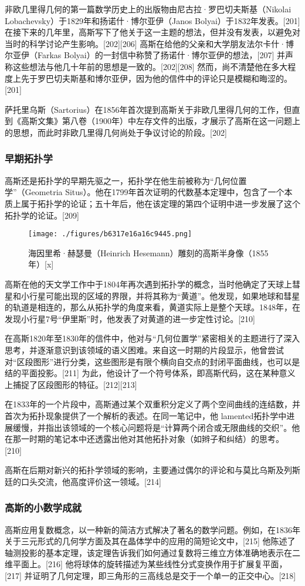 非欧几里得几何的第一篇数学历史上的出版物由尼古拉·罗巴切夫斯基（Nikolai Lobachevsky）于1829年和扬诺什·博尔亚伊（Janos Bolyai）于1832年发表。[201] 在接下来的几年里，高斯写下了他关于这一主题的想法，但并没有发表，以避免对当时的科学讨论产生影响。[202][206] 高斯在给他的父亲和大学朋友法尔卡什·博尔亚伊（Farkas Bolyai）的一封信中称赞了扬诺什·博尔亚伊的想法，[207] 并声称这些想法与他几十年前的思想是一致的。[202][208] 然而，尚不清楚他在多大程度上先于罗巴切夫斯基和博尔亚伊，因为他的信件中的评论只是模糊和晦涩的。[201]

萨托里乌斯（Sartorius）在1856年首次提到高斯关于非欧几里得几何的工作，但直到《高斯文集》第八卷（1900年）中左存文件的出版，才展示了高斯在这一问题上的思想，而此时非欧几里得几何尚处于争议讨论的阶段。[202]
\subsubsection{早期拓扑学}  
高斯还是拓扑学的早期先驱之一，拓扑学在他生前被称为“几何位置学”（Geometria Situs）。他在1799年首次证明的代数基本定理中，包含了一个本质上属于拓扑学的论证；五十年后，他在该定理的第四个证明中进一步发展了这个拓扑学的论证。[209]
\begin{figure}[ht]
\centering
\texttt{[image: ./figures/b6317e16a16c9445.png]}
\caption{海因里希·赫瑟曼（Heinrich Hesemann）雕刻的高斯半身像（1855年）[x]} \label{fig_KRGS_20}
\end{figure}
高斯在他的天文学工作中于1804年再次遇到拓扑学的概念，当时他确定了天球上彗星和小行星可能出现的区域的界限，并将其称为“黄道”。他发现，如果地球和彗星的轨道是相连的，那么从拓扑学的角度来看，黄道实际上是整个天球。1848年，在发现小行星7号“伊里斯”时，他发表了对黄道的进一步定性讨论。[210]

在高斯1820年至1830年的信件中，他对与“几何位置学”紧密相关的主题进行了深入思考，并逐渐意识到该领域的语义困难。来自这一时期的片段显示，他曾尝试对“区段图形”进行分类，这些图形是有限个横向自交点的封闭平面曲线，也可以是结的平面投影。[211] 为此，他设计了一个符号体系，即高斯代码，这在某种意义上捕捉了区段图形的特征。[212][213]

在1833年的一个片段中，高斯通过某个双重积分定义了两个空间曲线的连结数，并首次为拓扑现象提供了一个解析的表述。在同一笔记中，他 lamented拓扑学中进展缓慢，并指出该领域的一个核心问题将是“计算两个闭合或无限曲线的交织”。他在那一时期的笔记本中还透露出他对其他拓扑对象（如辫子和纠结）的思考。[210]

高斯在后期对新兴的拓扑学领域的影响，主要通过偶尔的评论和与莫比乌斯及列斯廷的口头交流，他高度评价这一领域。[214]
\subsubsection{高斯的小数学成就}  
高斯应用复数概念，以一种新的简洁方式解决了著名的数学问题。例如，在1836年关于三元形式的几何学方面及其在晶体学中的应用的简短论文中，[215] 他陈述了轴测投影的基本定理，该定理告诉我们如何通过复数将三维立方体准确地表示在二维平面上。[216] 他将球体的旋转描述为某些线性分式变换作用于扩展复平面，[217] 并证明了几何定理，即三角形的三高线总是交于一个单一的正交中心。[218]

